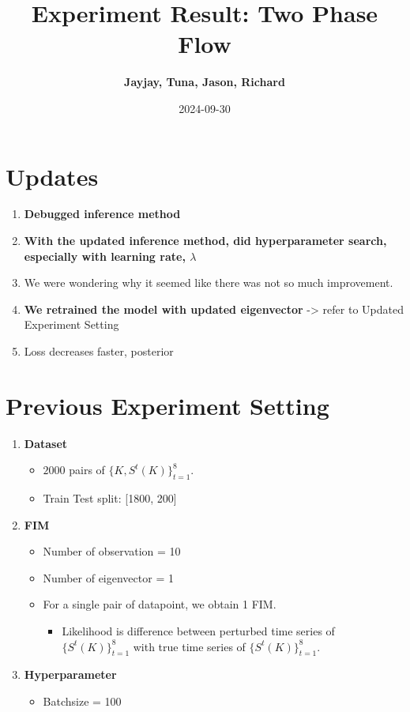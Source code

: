 \documentclass[
]{article}
\title{Experiment Result: Two Phase Flow}
\author{\textbf{Jayjay, Tuna, Jason, Richard}\\}
\date{2024-09-30}
\providecommand{\tightlist}{%
  \setlength{\itemsep}{0pt}\setlength{\parskip}{0pt}}\usepackage{longtable,booktabs,array}
\begin{document}
\maketitle


\section{Updates}\label{updates}

\begin{enumerate}
\def\labelenumi{\arabic{enumi}.}
\tightlist
\item
  \textbf{Debugged inference method}
\item
  \textbf{With the updated inference method, did hyperparameter search,
  especially with learning rate, \(\lambda\)}
\item
  We were wondering why it seemed like there was not so much
  improvement.
\item
  \textbf{We retrained the model with updated eigenvector}
  -\textgreater{} refer to Updated Experiment Setting
\item
  Loss decreases faster, posterior
\end{enumerate}

\section{Previous Experiment Setting}\label{previous-experiment-setting}

\begin{enumerate}
\def\labelenumi{\arabic{enumi}.}
\tightlist
\item
  \textbf{Dataset}

  \begin{itemize}
  \tightlist
  \item
    \(2000\) pairs of \(\{K, S^t(K)\}_{t=1}^8\).
  \item
    Train Test split: {[}1800, 200{]}
  \end{itemize}
\item
  \textbf{FIM}

  \begin{itemize}
  \tightlist
  \item
    Number of observation = 10
  \item
    Number of eigenvector = 1
  \item
    For a single pair of datapoint, we obtain 1 FIM.

    \begin{itemize}
    \tightlist
    \item
      Likelihood is difference between perturbed time series of
      \(\{S^t(K)\}_{t=1}^8\) with true time series of
      \(\{S^t(K)\}_{t=1}^8\).
    \end{itemize}
  \end{itemize}
\item
  \textbf{Hyperparameter}

  \begin{itemize}
  \tightlist
  \item
    Batchsize = 100
  \end{itemize}
\end{enumerate}
\end{document}

